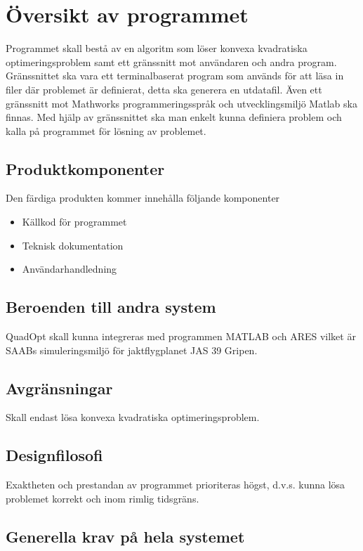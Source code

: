 \section{Översikt av programmet}
Programmet skall bestå av en algoritm som löser konvexa kvadratiska optimeringsproblem samt ett gränssnitt mot användaren och andra program. Gränssnittet ska vara ett terminalbaserat program som används för att läsa in filer där problemet är definierat, detta ska generera en utdatafil. Även ett gränssnitt mot Mathworks programmeringsspråk och utvecklingsmiljö Matlab ska finnas. Med hjälp av gränssnittet ska man enkelt kunna definiera problem och kalla på programmet för lösning av problemet.    

\subsection{Produktkomponenter}
Den färdiga produkten kommer innehålla följande komponenter
\begin{itemize}
\item{Källkod för programmet}
\item{Teknisk dokumentation}
\item{Användarhandledning}
\end{itemize}

\subsection{Beroenden till andra system}
QuadOpt skall kunna integreras med programmen MATLAB och ARES vilket är SAABs simuleringsmiljö för jaktflygplanet JAS 39 Gripen.

\subsection{Avgränsningar}
Skall endast lösa konvexa kvadratiska optimeringsproblem. 

\subsection{Designfilosofi}
Exaktheten och prestandan av programmet prioriteras högst, d.v.s. kunna lösa problemet korrekt och inom rimlig tidsgräns. 

\subsection{Generella krav på hela systemet}

